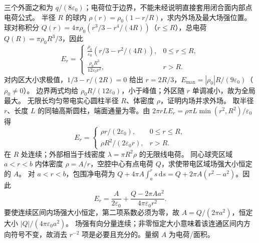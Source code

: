 \crosscheck 三个外面之和为 $q/(8\varepsilon_0)$；电荷位于边界，不能未经说明直接套用闭合面内部点电荷公式。
\problemtext 半径 $R$ 的球内 $\rho(r)=\rho_0(1-r/R)$，求内外场及最大场强位置。
\workings 球对称积分 $Q(r)=4\pi\rho_0(r^3/3-r^4/(4R))$（$r\le R$），总电荷 $Q(R)=\pi\rho_0R^3/3$，因此
\[
E_r=\begin{cases}
\frac{\rho_0}{\varepsilon_0}(r/3-r^2/(4R)),&0\le r\le R,\\
\frac{\rho_0 R^3}{12\varepsilon_0r^2},&r>R .
\end{cases}
\]
对内区大小求极值，$1/3-r/(2R)=0$ 给出 $r=2R/3$，$E_{\max}=|\rho_0|R/(9\varepsilon_0)$（$\rho_0\ne0$）。
\crosscheck 边界两式均给 $\rho_0R/(12\varepsilon_0)$，小于峰值；外区随 $r$ 单调减小，故为全局最大。
\problemtext 无限长均匀带电实心圆柱半径 $R$、体密度 $\rho$，证明内场并求外场。
\workings 取半径 $r$、长度 $L$ 的同轴高斯圆柱，端面通量为零。由 $2\pi rLE_r=\rho\pi L\min(r^2,R^2)/\varepsilon_0$ 得
\[
E_r=\begin{cases}
\rho r/(2\varepsilon_0),&0\le r\le R,\\
\rho R^2/(2\varepsilon_0r),&r>R .
\end{cases}
\]
\crosscheck 在 $R$ 处连续；外部相当于线密度 $\lambda=\pi R^2\rho$ 的无限线电荷。
\problemtext 同心球壳区域 $a<r<b$ 内体密度 $\rho=A/r$，空腔中心有点电荷 $Q$，求使带电区域场强大小恒定的 $A$。
\workings 对 $a<r<b$，包围净电荷为 $Q+4\pi A\int_a^r s\,\mathrm ds=Q+2\pi A(r^2-a^2)$。因此
\[
E_r=\frac{A}{2\varepsilon_0}+\frac{Q-2\pi Aa^2}{4\pi\varepsilon_0r^2}.
\]
要使连续区间内场强大小恒定，第二项系数必须为零，故 $A=Q/(2\pi a^2)$，恒定大小 $|Q|/(4\pi\varepsilon_0a^2)$。
\crosscheck 场强有向分量连续；非零恒定大小意味着该连通区间内方向符号不变，故消去 $r^{-2}$ 项是必要且充分的。量纲 $A$ 为电荷/面积。

